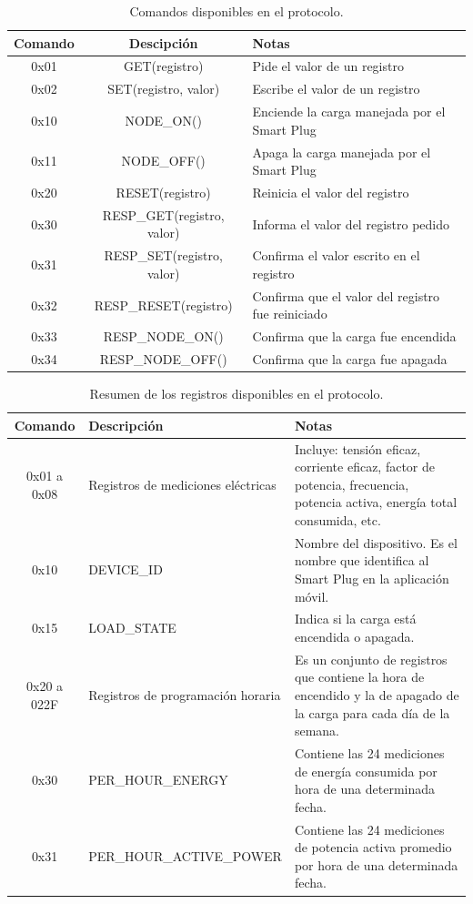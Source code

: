 \begin{table}[h]
	\centering
	\caption[Comandos]{Comandos disponibles en el protocolo.}
	\begin{tabular}{c c p{6cm}}    
		\toprule
		\textbf{Comando} 	 & \textbf{Descipción}  & \textbf{Notas} \\
		\midrule
		0x01  & GET(registro)  				& Pide el valor de un registro \\		
		0x02  & SET(registro, valor)  		& Escribe el valor de un registro \\
		0x10  & NODE\_ON()  					& Enciende la carga manejada por el Smart Plug \\
		0x11  & NODE\_OFF()  				& Apaga la carga manejada por el Smart Plug \\
		0x20  & RESET(registro)  			& Reinicia el valor del registro \\
		0x30  & RESP\_GET(registro, valor)  	& Informa el valor del registro pedido \\
		0x31  & RESP\_SET(registro, valor)  	& Confirma el valor escrito en el registro \\
		0x32  & RESP\_RESET(registro)  		& Confirma que el valor del registro fue reiniciado \\
		0x33  & RESP\_NODE\_ON()  			& Confirma que la carga fue encendida \\
		0x34  & RESP\_NODE\_OFF()  			& Confirma que la carga fue apagada \\
		\bottomrule
		\hline
	\end{tabular}
	\label{tab:comandos_trama}
\end{table}

\begin{table}[h]
	\centering
	\caption[Registros]{Resumen de los registros disponibles en el protocolo.}
	\begin{tabular}{c p{5cm} p{6cm}}    
		\toprule
		\textbf{Comando} 	 & \textbf{Descripción}  & \textbf{Notas} \\
		\midrule
		0x01 a 0x08  	& Registros de mediciones eléctricas  	& Incluye: tensión eficaz, corriente eficaz, factor de potencia, frecuencia, potencia activa, energía total consumida, etc. \\		
		0x10  			& DEVICE\_ID  							& Nombre del dispositivo. Es el nombre que identifica al Smart Plug en la aplicación móvil. \\
		0x15  			& LOAD\_STATE  							& Indica si la carga está encendida o apagada. \\
		0x20 a 022F  	& Registros de programación horaria  	& Es un conjunto de registros que contiene la hora de encendido y la de apagado de la carga para cada día de la semana. \\
		0x30  			& PER\_HOUR\_ENERGY  						& Contiene las 24 mediciones de energía consumida por hora de una determinada fecha. \\
		0x31  			& PER\_HOUR\_ACTIVE\_POWER  				& Contiene las 24 mediciones de potencia activa promedio por hora de una determinada fecha. \\
		\bottomrule
		\hline
	\end{tabular}
	\label{tab:registros_trama}
\end{table}

